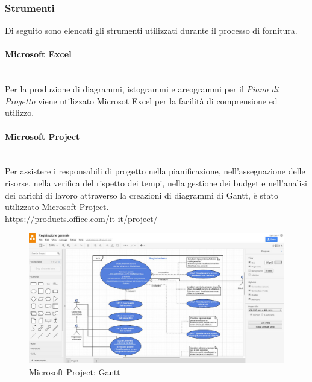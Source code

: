 		\subsubsection{Strumenti}
		Di seguito sono elencati gli strumenti utilizzati durante il processo di fornitura.
		\paragraph{Microsoft Excel} \mbox{}\\
		Per la produzione di diagrammi, istogrammi e areogrammi per il \textit{Piano di Progetto} viene utilizzato Microsot Excel per la facilità di comprensione ed utilizzo.
		\paragraph{Microsoft Project} \mbox{}\\
		Per assistere i responsabili di progetto nella pianificazione, nell'assegnazione delle risorse, nella verifica del rispetto dei tempi, nella gestione dei budget e nell'analisi dei carichi di lavoro attraverso la creazioni di diagrammi di Gantt, è stato utilizzato Microsoft Project. \\
		\url{https://products.office.com/it-it/project/}
		\begin{figure}[H]
			\includegraphics[width=0.99\linewidth]{res/images/drawio.jpg}
			\caption{Microsoft Project: Gantt}
		\end{figure} 

     
